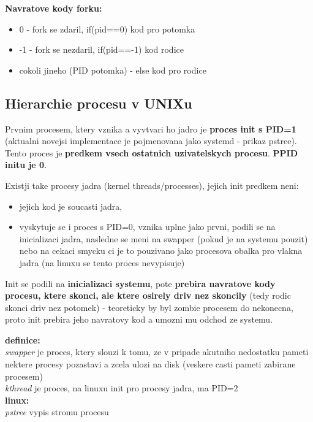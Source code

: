 \documentclass[a4paper, 11pt]{article}
\begin{document}
\textbf{Navratove kody forku:}
\begin{itemize}
    \item 0 - fork se zdaril, if(pid==0) { kod pro potomka }
    \item -1 - fork se nezdaril, if(pid==-1) { kod rodice }
    \item cokoli jineho (PID potomka) - else { kod pro rodice } \\
\end{itemize}

\newpage

\subsection{Hierarchie procesu v UNIXu}
Prvnim procesem, ktery vznika a vyvtvari ho jadro je \textbf{proces init s PID=1} (aktualni novejsi implementace je pojmenovana jako systemd - prikaz pstree). Tento proces je \textbf{predkem vsech ostatnich uzivatelskych procesu}. \textbf{PPID initu je 0}.

Existji take procesy jadra (kernel threads/processes), jejich init predkem neni:
\begin{itemize}
    \item jejich kod je soucasti jadra,
    \item vyskytuje se i proces s PID=0, vznika uplne jako prvni, podili se na inicializaci jadra, nasledne se meni na swapper (pokud je na systemu pouzit) nebo na cekaci smycku ci je to pouzivano jako procesova obalka pro vlakna jadra (na linuxu se tento proces nevypisuje) \\
\end{itemize}

Init se podili na \textbf{inicializaci systemu}, pote \textbf{prebira navratove kody procesu, ktere skonci, ale ktere osirely driv nez skoncily} (tedy rodic skonci driv nez potomek) - teoreticky by byl zombie procesem do nekonecna, proto init prebira jeho navratovy kod a umozni mu odchod ze systemu.

\textbf{definice:} \\[0.5em]
\textit{swapper} je proces, ktery slouzi k tomu, ze v pripade akutniho nedostatku pameti nektere procesy pozastavi a zcela ulozi na disk (veskere casti pameti zabirane procesem) \\[0.2em]
\textit{kthread} je proces, na linuxu init pro procesy jadra, ma PID=2 \\

\textbf{linux:} \\[0.5em]
\textit{pstree} vypis stromu procesu \\
\end{document}
